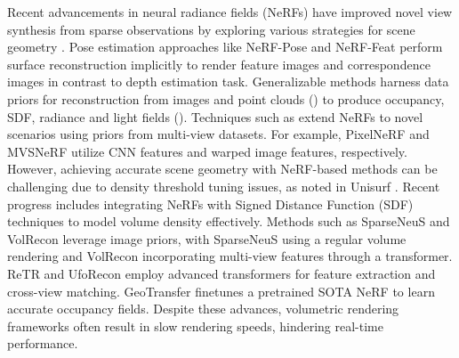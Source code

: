 Recent advancements in neural radiance fields (NeRFs) have improved novel view synthesis from sparse observations by exploring various strategies for scene geometry \cite{deng2022depth, niemeyer2022regnerf, wynn2023diffusionerf, jain2021putting, kim2022infonerf}. Pose estimation approaches like NeRF-Pose \cite{nerfpose} and NeRF-Feat\cite{nerfeat} perform surface reconstruction implicitly to render feature images and correspondence images in contrast to depth estimation task. Generalizable methods harness data priors for reconstruction from images and point clouds (\eg \cite{p2s,nksr,poco,fssdf,mixing}) to produce occupancy, SDF, radiance and light fields (\eg \cite{lfn,lfnr,genlf}).   
Techniques such as \cite{chen2021mvsnerf, johari2022geonerf, chibane2021stereo, liu2022neural, wang2021ibrnet, yu2021pixelnerf} extend NeRFs to novel scenarios using priors from multi-view datasets.
For example, PixelNeRF \cite{yu2021pixelnerf} and MVSNeRF \cite{chen2021mvsnerf} utilize CNN features and warped image features, respectively. However, achieving accurate scene geometry with NeRF-based methods can be challenging due to density threshold tuning issues, as noted in Unisurf \cite{oechsle2021unisurf}. Recent progress includes integrating NeRFs with Signed Distance Function (SDF) techniques to model volume density effectively. Methods such as SparseNeuS \cite{long2022sparseneus} and VolRecon \cite{ren2023volrecon} leverage image priors, with SparseNeuS using a regular volume rendering and VolRecon incorporating multi-view features through a transformer. ReTR \cite{liang2024retr} and UfoRecon \cite{na2024uforecon} employ advanced transformers for feature extraction and cross-view matching. GeoTransfer \cite{jena2024geotransfer} finetunes a pretrained SOTA NeRF to learn accurate occupancy fields. Despite these advances, volumetric rendering frameworks often result in slow rendering speeds, hindering real-time performance.

